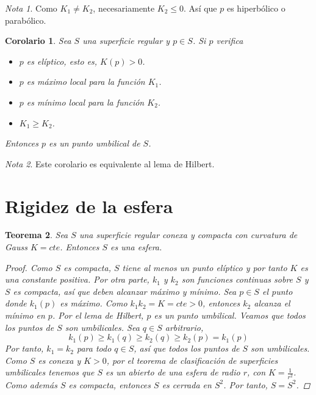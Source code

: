 \documentclass{report}
\newtheorem{theorem}{Teorema}[chapter]
\newtheorem{corollary}[theorem]{Corolario}
\theoremstyle{remark}
\theoremstyle{remark}
\newtheorem*{note}{Nota}
\theoremstyle{definition}
\theoremstyle{definition}
\theoremstyle{definition}
\begin{document}
\begin{note}
    Como $K_1 \neq K_2$, necesariamente $K_2 \leq 0$. Así que $p$ es hiperbólico o parabólico.
\end{note}

\begin{corollary}
    Sea $S$ una superficie regular y $p \in S$. Si $p$ verifica
    \begin{itemize}
        \item $p$ es elíptico, esto es, $K(p) > 0$.
        \item $p$ es máximo local para la función $K_1$.
        \item $p$ es mínimo local para la función $K_2$.
        \item $K_1 \geq K_2$.
    \end{itemize}
    Entonces $p$ es un punto umbilical de $S$.
\end{corollary}

\begin{note}
    Este corolario es equivalente al lema de Hilbert.
\end{note}

\section{Rigidez de la esfera}

\begin{theorem}
    Sea $S$ una superficie regular conexa y compacta con curvatura de Gauss $K = cte$.
    Entonces $S$ es una esfera.

    \begin{proof}
        Como $S$ es compacta, $S$ tiene al menos un punto elíptico y por tanto $K$ es una constante positiva.
        Por otra parte, $k_1$ y $k_2$ son funciones continuas sobre $S$ y $S$ es compacta, así que deben alcanzar máximo y mínimo.
        Sea $p \in S$ el punto donde $k_1(p)$ es máximo.
        Como $k_1 k_2 = K = cte > 0$, entonces $k_2$ alcanza el mínimo en $p$.
        Por el lema de Hilbert, $p$ es un punto umbilical.
        Veamos que todos los puntos de $S$ son umbilicales.
        Sea $q \in S$ arbitrario, $$k_1(p) \geq k_1(q) \geq k_2(q) \geq k_2(p) = k_1(p)$$
        Por tanto, $k_1 = k_2$ para todo $q \in S$, así que todos los puntos de $S$ son umbilicales.
        Como $S$ es conexa y $K>0$, por el teorema de clasificación de superficies umbilicales tenemos que $S$ es un abierto de una esfera de radio $r$, con $K = \frac{1}{r^2}$.
        Como además $S$ es compacta, entonces $S$ es cerrada en $S^2$.
        Por tanto, $S = S^2$.
    \end{proof}
\end{theorem}
\end{document}
